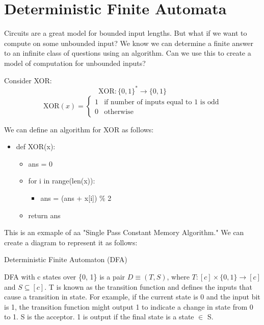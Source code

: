 \chapter{Deterministic Finite Automata}

Circuits are a great model for bounded input lengths. But what if we want to compute on some unbounded input? We know we can determine a finite answer to an infinite class of questions using an algorithm. Can we use this to create a model of computation for unbounded inputs?

Consider XOR:
\[
    \text{XOR}: \{0,1\}^* \rightarrow \{0,1\}
\]
\begin{equation}
    \text{XOR}(x) = 
    \begin{cases}
        1 & \text{if number of inputs equal to 1 is odd} \\
        0 & \text{otherwise}
    \end{cases}
\end{equation}

We can define an algorithm for XOR as follows:
\begin{itemize}
    \item def XOR(x):
    \begin{itemize}
        \item ans = 0
        \item for i in range(len(x)):
        \begin{itemize}
            \item ans = (ans + x[i]) \% 2
        \end{itemize}
        \item return ans
    \end{itemize}
\end{itemize}

This is an exmaple of aa "Single Pass Constant Memory Algorithm." We can create a diagram to represent it as follows:
\begin{center}
\end{center}

\begin{definition}
    Deterministic Finite Automaton (DFA)

    DFA with c states over \{0, 1\} is a pair $D \equiv (T, S)$, where $T: [c] \times \{0, 1\} \rightarrow [c]$ and $S \subseteq [c]$. T is known as the transition function and defines the inputs that cause a transition in state. For example, if the current state is 0 and the input bit is 1, the transition function might output 1 to indicate a change in state from 0 to 1. S is the acceptor. 1 is output if the final state is a state $\in$ S.
\end{definition}

